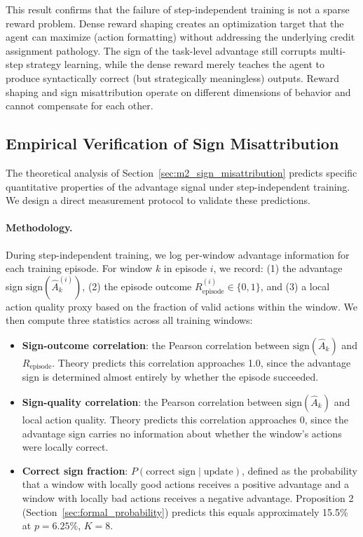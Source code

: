 This result confirms that the failure of step-independent training is not a sparse reward problem. Dense reward shaping creates an optimization target that the agent can maximize (action formatting) without addressing the underlying credit assignment pathology. The sign of the task-level advantage still corrupts multi-step strategy learning, while the dense reward merely teaches the agent to produce syntactically correct (but strategically meaningless) outputs. Reward shaping and sign misattribution operate on different dimensions of behavior and cannot compensate for each other.

\subsection{Empirical Verification of Sign Misattribution}
\label{sec:sign_verification}

The theoretical analysis of Section~\ref{sec:m2_sign_misattribution} predicts specific quantitative properties of the advantage signal under step-independent training. We design a direct measurement protocol to validate these predictions.

\paragraph{Methodology.}
During step-independent training, we log per-window advantage information for each training episode. For window $k$ in episode $i$, we record: (1) the advantage sign $\text{sign}(\hat{A}_k^{(i)})$, (2) the episode outcome $R_{\text{episode}}^{(i)} \in \{0, 1\}$, and (3) a local action quality proxy based on the fraction of valid actions within the window. We then compute three statistics across all training windows:
\begin{itemize}
    \item \textbf{Sign-outcome correlation}: the Pearson correlation between $\text{sign}(\hat{A}_k)$ and $R_{\text{episode}}$. Theory predicts this correlation approaches 1.0, since the advantage sign is determined almost entirely by whether the episode succeeded.
    \item \textbf{Sign-quality correlation}: the Pearson correlation between $\text{sign}(\hat{A}_k)$ and local action quality. Theory predicts this correlation approaches 0, since the advantage sign carries no information about whether the window's actions were locally correct.
    \item \textbf{Correct sign fraction}: $P(\text{correct sign} \mid \text{update})$, defined as the probability that a window with locally good actions receives a positive advantage and a window with locally bad actions receives a negative advantage. Proposition 2 (Section~\ref{sec:formal_probability}) predicts this equals approximately 15.5\% at $p = 6.25\%$, $K = 8$.
\end{itemize}

